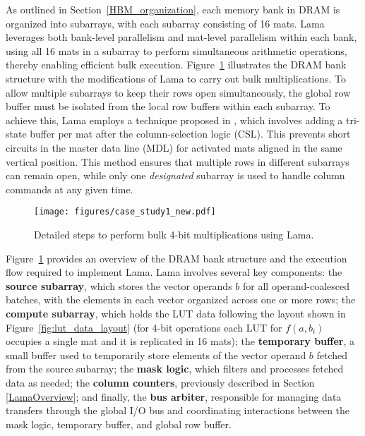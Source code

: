 As outlined in Section~\ref{HBM_organization}, each memory bank in DRAM is organized into subarrays, with each subarray consisting of 16 mats. Lama leverages both bank-level parallelism and mat-level parallelism within each bank, using all 16 mats in a subarray to perform simultaneous arithmetic operations, thereby enabling efficient bulk execution. Figure~\ref{fig:case_study1} illustrates the DRAM bank structure with the modifications of Lama to carry out bulk multiplications. To allow multiple subarrays to keep their rows open simultaneously, the global row buffer must be isolated from the local row buffers within each subarray. To achieve this, Lama employs a technique proposed in \cite{salp}, which involves adding a tri-state buffer per mat after the column-selection logic (CSL). This prevents short circuits in the master data line (MDL) for activated mats aligned in the same vertical position. This method ensures that multiple rows in different subarrays can remain open, while only one \textit{designated} subarray is used to handle column commands at any given time.


\begin{figure}[t!]
\centering
\texttt{[image: figures/case\_study1\_new.pdf]}
\caption{Detailed steps to perform bulk 4-bit multiplications using Lama.}
\label{fig:case_study1}
\vskip -0.15in
\end{figure}

Figure~\ref{fig:case_study1} provides an overview of the DRAM bank structure and the execution flow required to implement Lama. Lama involves several key components: the \textbf{source subarray}, which stores the vector operands $b$ for all operand-coalesced batches, with the elements in each vector organized across one or more rows; the \textbf{compute subarray}, which holds the LUT data following the layout shown in Figure~\ref{fig:lut_data_layout} (for 4-bit operations each LUT for $f(a,b_{i})$ occupies a single mat and it is replicated in 16 mats); the \textbf{temporary buffer}, a small buffer used to temporarily store elements of the vector operand $b$ fetched from the source subarray; the \textbf{mask logic}, which filters and processes fetched data as needed; the \textbf{column counters}, previously described in Section \ref{LamaOverview}; and finally, the \textbf{bus arbiter}, responsible for managing data transfers through the global I/O bus and coordinating interactions between the mask logic, temporary buffer, and global row buffer.

